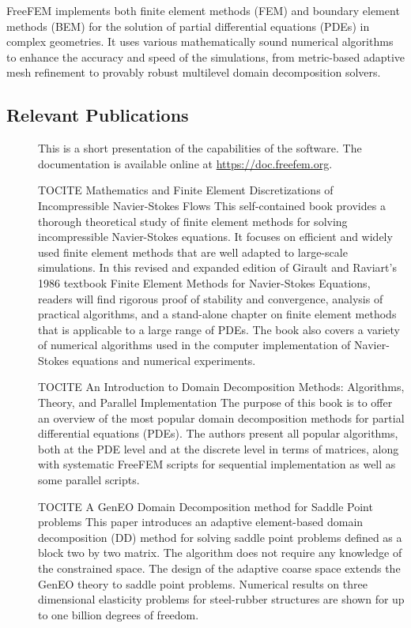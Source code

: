 FreeFEM implements both finite element methods (FEM) and boundary element methods (BEM) for the solution of partial differential equations (PDEs) in complex geometries. It uses various mathematically sound numerical algorithms to enhance the accuracy and speed of the simulations, from metric-based adaptive mesh refinement to provably robust multilevel domain decomposition solvers.


\subsection{Relevant Publications}
\label{sec:Freefem++:publications}

\begin{description}
\item[] This is a short presentation of the capabilities of the software. The documentation is available online at \url{https://doc.freefem.org}.

{TOCITE Mathematics and Finite Element Discretizations of Incompressible Navier-Stokes Flows} This self-contained book provides a thorough theoretical study of finite element methods for solving incompressible Navier-Stokes equations. It focuses on efficient and widely used finite element methods that are well adapted to large-scale simulations. In this revised and expanded edition of Girault and Raviart's 1986 textbook Finite Element Methods for Navier-Stokes Equations, readers will find rigorous proof of stability and convergence, analysis of practical algorithms, and a stand-alone chapter on finite element methods that is applicable to a large range of PDEs. The book also covers a variety of numerical algorithms used in the computer implementation of Navier-Stokes equations and numerical experiments.

{TOCITE An Introduction to Domain Decomposition Methods: Algorithms, Theory, and Parallel Implementation} The purpose of this book is to offer an overview of the most popular domain decomposition methods for partial differential equations (PDEs). The authors present all popular algorithms, both at the PDE level and at the discrete level in terms of matrices, along with systematic FreeFEM scripts for sequential implementation as well as some parallel scripts.

{TOCITE A GenEO Domain Decomposition method for Saddle Point problems} This paper introduces an adaptive element-based domain decomposition (DD) method for solving saddle point problems defined as a block two by two matrix. The algorithm does not require any knowledge of the constrained space. The design of the adaptive coarse space extends the GenEO theory to saddle point problems. Numerical results on three dimensional elasticity problems for steel-rubber structures are shown for up to one billion degrees of freedom.


\end{description}
